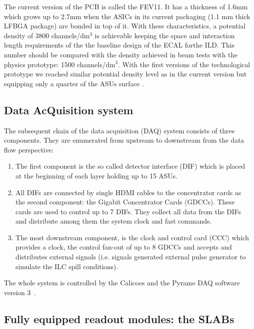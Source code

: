 \documentclass[a4paper,11pt]{article}
\begin{document}
The current version of the PCB is called the FEV11. It has a thickness of 1.6mm which
grows up to 2.7mm when the ASICs in its current packaging (1.1 mm thick LFBGA package) are
bonded in top of it.
With these characteristics, a potential density of
3800 channels/dm$^{3}$ is achievable keeping the space and
interaction length requirements of the the baseline design of the ECAL forthe ILD.
This number should be compared with
the density achieved in beam tests with the physics prototype: 1500 channels/dm$^{3}$.
With the first versions
of the technological prototype we reached similar potential density level as in
the current version but equipping only a
quarter of the ASUs surface \cite{Amjad:2014tha}.

\subsection{Data AcQuisition system}
\label{sec:DAQ}

The subsequent chain of the data acquisition (DAQ)\cite{Gastaldi:2014vaa} system consists of three components.
They are enumerated from upstream to downstream from the data flow perspective:

\begin{enumerate}
\item The first component is the so called detector interface (DIF) which is placed at the beginning of each layer holding up to 15 ASUs.
\item All DIFs are connected by single HDMI cables to the concentrator cards as the second component: the Gigabit Concentrator Cards (GDCCs). These cards are used to control up to 7 DIFs. They collect all data from the DIFs and distribute among them the system clock and fast commands.
  \item The most downstream component, is the clock and control card (CCC) which
provides a clock, the control fan-out of up to 8 GDCCs and accepts and distributes external signals (i.e. signals
generated external pulse generator to simulate the ILC spill conditions).
\end{enumerate}

The whole system is controlled by the Calicoes and the Pyrame DAQ software version 3~\cite{Rubio-Roy:2017ere,Magniette:2018wdz}.

\subsection{Fully equipped readout modules: the SLABs}
\label{sec:setup}
\end{document}
